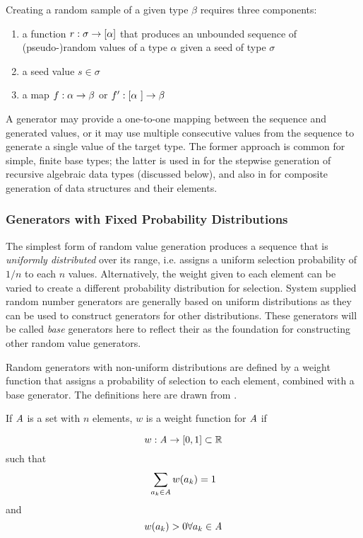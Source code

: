 Creating a random sample of a given type $\beta$ requires three components:
\begin{enumerate}
\item a function $r: \sigma \rightarrow [ \alpha ]$ that produces 
an unbounded sequence of (pseudo-)random values of a type $\alpha$ given a seed of type $\sigma$
\item a seed value $s \in \sigma$
\item a map $f : \alpha \rightarrow \beta$ or $f': [ \alpha\ ] \rightarrow \beta\ $
\end{enumerate}
\noindent
A generator may provide a one-to-one mapping between the sequence and generated values,
or it may use multiple consecutive values from the sequence 
to generate a single value of the target type.
The former approach is common for simple, finite base types;
the latter is used in \QC for the stepwise generation of recursive algebraic data types (discussed below),
and also in \GC for composite generation of data structures and their elements.

\subsubsection{Generators with Fixed Probability Distributions}
The simplest form of random value generation produces 
a sequence that is \emph{uniformly distributed} over its range,
i.e. assigns a uniform selection probability of $1/n$ to each $n$ values.
Alternatively, the weight given to each element 
can be varied to create a different probability distribution for selection.
System supplied random number generators are generally based on uniform distributions
as they can be used to construct generators for other distributions.
These generators will be called \emph{base} generators here
to reflect their \role as the foundation for constructing other random value generators.

Random generators with non-uniform distributions are defined by 
a weight function that assigns a probability of selection to each element,
combined with a base generator. 
The definitions here are drawn from \cite{Knuth1997:ACP270146}.

\begin{df}
If $\mathit{A}$ is a set with $n$ elements, 
$w$ is a weight function for $\mathit{A}$ if

$$w: \mathit{A} \rightarrow [0, 1] \subset \mathbb{R} $$
such that
$$\sum_{a_{k} \in \mathit{A}} w(a_k) = 1 $$
and
$$w(a_k) > 0 \forall a_k \in \mathit{A}$$
\end{df}

